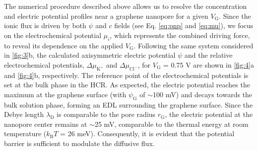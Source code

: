 The numerical procedure described above allows us to resolve the
concentration and electric potential profiles near a graphene
nanopore for a given $V_{\mathrm{G}}$. Since the ionic flux is driven
by both $\psi$ and $c$ fields (see Eq. \eqref{eq:pnp} and \eqref{eq:mu}),
we focus on the electrochemical potential $\mu_{i}$, which represents
the combined driving force, to reveal its dependence on the applied
$V_{\mathrm{G}}$. Following the same system considered in \Fig{}
\ref{fig:3}b, the calculated axisymmetric electric potential $\psi$
and the relative electrochemical potentials,
$\Delta \mu_{\mathrm{K^{+}}}$ and $\Delta \mu_{\mathrm{Cl^{-}}}$, for
$V_{\mathrm{G}}$ = 0.75 V are shown in \Fig{} \ref{fig:4}a and
\ref{fig:4}b, respectively. The reference point of the electrochemical
potentials is set at the bulk phase in the HCR. As expected, the
electric potential reaches the maximum at the graphene surface (with
$\psi_{\mathrm{G}}$ of $\sim$100 mV) and decays towards the bulk
solution phase, forming an EDL surrounding the graphene surface. Since
the Debye length $\lambda_{\mathrm{D}}$ is comparable to the
pore radius $r_{\mathrm{G}}$, the electric potential at the nanopore
center remains at $\sim$25 mV, comparable to the thermal energy at
room temperature ($k_{\mathrm{B}}T$ = 26 meV). Consequently, it is
evident that the potential barrier is sufficient to modulate the
diffusive flux.

